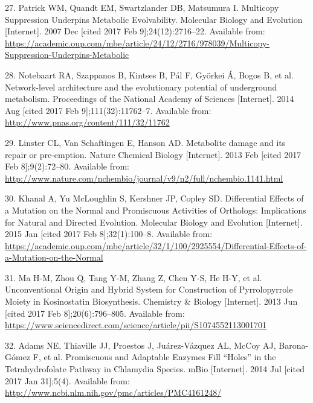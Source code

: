 \documentclass[12pt,twoside]{reedthesis}
\begin{document}
  \hypertarget{ref-patrick_multicopy_2007}{}
  27. Patrick WM, Quandt EM, Swartzlander DB, Matsumura I. Multicopy
  Suppression Underpins Metabolic Evolvability. Molecular Biology and
  Evolution {[}Internet{]}. 2007 Dec {[}cited 2017 Feb
  9{]};24(12):2716--22. Available from:
  \url{https://academic.oup.com/mbe/article/24/12/2716/978039/Multicopy-Suppression-Underpins-Metabolic}
  
  \hypertarget{ref-notebaart_network-level_2014}{}
  28. Notebaart RA, Szappanos B, Kintses B, Pál F, Györkei Á, Bogos B, et
  al. Network-level architecture and the evolutionary potential of
  underground metabolism. Proceedings of the National Academy of Sciences
  {[}Internet{]}. 2014 Aug {[}cited 2017 Feb 9{]};111(32):11762--7.
  Available from: \url{http://www.pnas.org/content/111/32/11762}
  
  \hypertarget{ref-linster_metabolite_2013}{}
  29. Linster CL, Van Schaftingen E, Hanson AD. Metabolite damage and its
  repair or pre-emption. Nature Chemical Biology {[}Internet{]}. 2013 Feb
  {[}cited 2017 Feb 8{]};9(2):72--80. Available from:
  \url{http://www.nature.com/nchembio/journal/v9/n2/full/nchembio.1141.html}
  
  \hypertarget{ref-khanal_differential_2015}{}
  30. Khanal A, Yu McLoughlin S, Kershner JP, Copley SD. Differential
  Effects of a Mutation on the Normal and Promiscuous Activities of
  Orthologs: Implications for Natural and Directed Evolution. Molecular
  Biology and Evolution {[}Internet{]}. 2015 Jan {[}cited 2017 Feb
  8{]};32(1):100--8. Available from:
  \url{https://academic.oup.com/mbe/article/32/1/100/2925554/Differential-Effects-of-a-Mutation-on-the-Normal}
  
  \hypertarget{ref-ma_unconventional_2013}{}
  31. Ma H-M, Zhou Q, Tang Y-M, Zhang Z, Chen Y-S, He H-Y, et al.
  Unconventional Origin and Hybrid System for Construction of
  Pyrrolopyrrole Moiety in Kosinostatin Biosynthesis. Chemistry \& Biology
  {[}Internet{]}. 2013 Jun {[}cited 2017 Feb 8{]};20(6):796--805.
  Available from:
  \url{https://www.sciencedirect.com/science/article/pii/S1074552113001701}
  
  \hypertarget{ref-adams_promiscuous_2014}{}
  32. Adams NE, Thiaville JJ, Proestos J, Juárez-Vázquez AL, McCoy AJ,
  Barona-Gómez F, et al. Promiscuous and Adaptable Enzymes Fill ``Holes''
  in the Tetrahydrofolate Pathway in Chlamydia Species. mBio
  {[}Internet{]}. 2014 Jul {[}cited 2017 Jan 31{]};5(4). Available from:
  \url{http://www.ncbi.nlm.nih.gov/pmc/articles/PMC4161248/}
  
\end{document}
